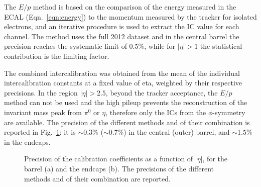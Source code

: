 \documentclass[journal]{IEEEtran}
\begin{document}
The $E/p$ method is based on the comparison of the energy measured in the ECAL (Eqn.~\ref{eqn:energy}) to the momentum measured by the tracker for isolated electrons, and an iterative procedure is used to extract the IC value for each channel. The method uses the full 2012 dataset and in the central barrel the precision reaches the systematic limit of 0.5\%, while for $\vert\eta\vert>1$ the statistical contribution is the limiting factor.

The combined intercalibration was obtained from the mean of the individual intercalibration constants at a fixed value of eta, weighted by their respective precisions. In the region $\vert\eta\vert>2.5$, beyond the tracker acceptance, the $E/p$ method can not be used and the high pileup prevents the reconstruction of the invariant mass peak from $\pi^0$ or $\eta$, therefore only the ICs from the $\phi$-symmetry are available. The precision of the different methods and of their combination is reported in Fig.~\ref{fig:intercalib}: it is $\sim$0.3\% ($\sim$0.7\%) in the central (outer) barrel, and $\sim$1.5\% in the endcaps.
%
\begin{figure}[!t]
  \begin{center}
    \caption{Precision of the calibration coefficients as a function of $\vert\eta\vert$, for the barrel (a) and the endcaps (b). The precisions of the different methods and of their combination are reported. \label{fig:intercalib}}
  \end{center}
\end{figure}
%
\end{document}
